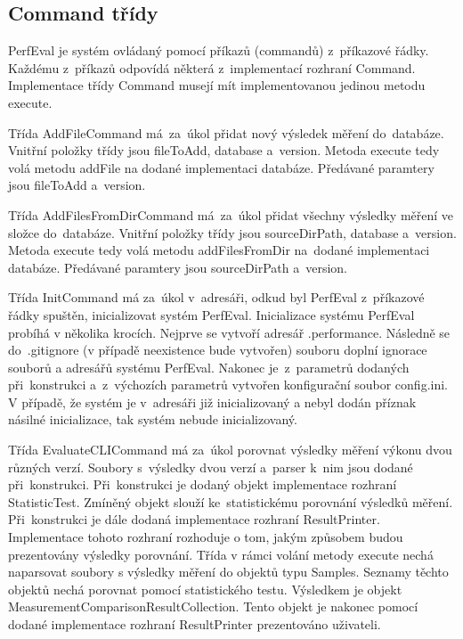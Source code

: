 \subsection{Command třídy}

PerfEval je systém ovládaný pomocí příkazů (commandů) z~příkazové řádky. Každému z~příkazů
odpovídá některá z~implementací rozhraní Command. Implementace třídy Command musejí mít implementovanou
jedinou metodu execute.

Třída AddFileCommand má~za~úkol přidat nový výsledek měření do~databáze. Vnitřní položky
třídy jsou fileToAdd, database a~version. Metoda execute tedy volá metodu addFile na dodané implementaci
databáze. Předávané paramtery jsou fileToAdd a~version.

Třída AddFilesFromDirCommand má~za~úkol přidat všechny výsledky měření ve složce do~databáze. Vnitřní položky
třídy jsou sourceDirPath, database a~version. Metoda execute tedy volá metodu addFilesFromDir na~dodané implementaci
databáze. Předávané paramtery jsou sourceDirPath a~version.

Třída InitCommand má za~úkol v~adresáři, odkud byl PerfEval z~příkazové řádky spuštěn, inicializovat systém PerfEval.
Inicializace systému PerfEval probíhá v několika krocích. Nejprve se vytvoří adresář .performance. Následně se do~.gitignore
(v případě neexistence bude vytvořen) souboru doplní ignorace souborů a adresářů systému PerfEval. Nakonec je~z~parametrů
dodaných při~konstrukci a~z~výchozích parametrů vytvořen konfigurační soubor config.ini. V případě, že systém je
v~adresáři již inicializovaný a nebyl dodán příznak násilné inicializace, tak systém nebude inicializovaný.

Třída EvaluateCLICommand má za~úkol porovnat výsledky měření výkonu dvou různých verzí.
Soubory s~výsledky dvou verzí a~parser k~nim jsou dodané při~konstrukci. Při~konstrukci
je dodaný objekt implementace rozhraní StatisticTest. Zmíněný objekt slouží ke~statistickému
porovnání výsledků měření. Při~konstrukci je dále dodaná implementace rozhraní ResultPrinter.
Implementace tohoto rozhraní rozhoduje o tom, jakým způsobem budou prezentovány výsledky porovnání.
Třída v rámci volání metody execute nechá naparsovat soubory s výsledky měření do objektů typu Samples.
Seznamy těchto objektů nechá porovnat pomocí statistického testu. Výsledkem je objekt MeasurementComparisonResultCollection.
Tento objekt je nakonec pomocí dodané implementace rozhraní ResultPrinter prezentováno uživateli.

